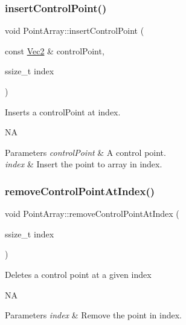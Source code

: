 \subsubsection{\texorpdfstring{insert\+Control\+Point()}{insertControlPoint()}\hspace{0.1cm}{\footnotesize\ttfamily [2/2]}}
{\footnotesize\ttfamily void Point\+Array\+::insert\+Control\+Point (\begin{DoxyParamCaption}\item[{const \hyperlink{classVec2}{Vec2} \&}]{control\+Point,  }\item[{ssize\+\_\+t}]{index }\end{DoxyParamCaption})}

Inserts a control\+Point at index.

NA 
\begin{DoxyParams}{Parameters}
{\em control\+Point} & A control point. \\
\hline
{\em index} & Insert the point to array in index. \\
\hline
\end{DoxyParams}
\mbox{\label{classPointArray_aadb3246ab7be6a4ccce90a3847ad5da0}} 
\subsubsection{\texorpdfstring{remove\+Control\+Point\+At\+Index()}{removeControlPointAtIndex()}\hspace{0.1cm}{\footnotesize\ttfamily [1/2]}}
{\footnotesize\ttfamily void Point\+Array\+::remove\+Control\+Point\+At\+Index (\begin{DoxyParamCaption}\item[{ssize\+\_\+t}]{index }\end{DoxyParamCaption})}

Deletes a control point at a given index

NA 
\begin{DoxyParams}{Parameters}
{\em index} & Remove the point in index. \\
\hline
\end{DoxyParams}
\mbox{\label{classPointArray_aadb3246ab7be6a4ccce90a3847ad5da0}} 
